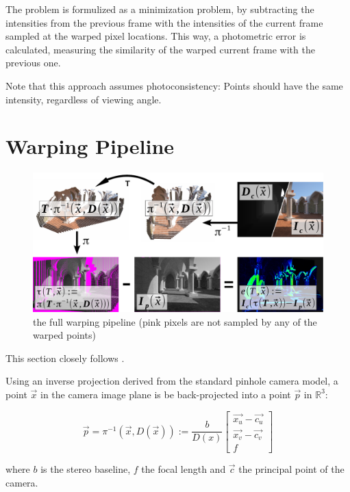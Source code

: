 The problem is formulized as a minimization problem, by subtracting the
intensities from the previous frame with the intensities of the current frame
sampled at the warped pixel locations. This way, a photometric error is
calculated, measuring the similarity of the warped current frame with the
previous one.

Note that this approach assumes photoconsistency: Points should have the same
intensity, regardless of viewing angle.


\section{Warping Pipeline}

\begin{figure}[h]
    \centering
    \includegraphics[width=\textwidth]{images/warp_pipeline.pdf}
    \caption{the full warping pipeline (pink pixels are not sampled by any of the warped points)}
    \label{fig:warp_pipeline}
\end{figure}

This section closely follows \cite{omaridenseodometry}.

Using an inverse projection derived from the standard pinhole camera model, a
point $ \vec{x} $ in the camera image plane is be back-projected into a point
$ \vec{p} $ in $ \mathbb{R}^3 $:

\begin{equation}
    \label{eq:backprojection}
    \vec{p} = \pi^{-1}(\vec{x}, D(\vec{x})) := \frac{b}{D(x)}
    \begin{bmatrix}
        \vec{x_u} - \vec{c_u} \\
        \vec{x_v} - \vec{c_v} \\
        f
    \end{bmatrix}
\end{equation}

where $b$ is the stereo baseline, $f$ the focal length and $\vec{c}$ the principal point of the camera.

